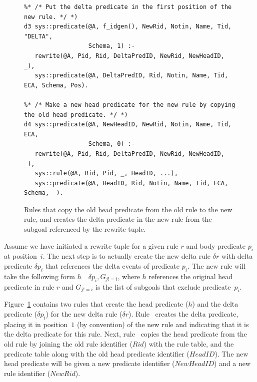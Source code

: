 \begin{figure}[!t]
\ssp
\centering
\begin{lstlisting}
%* /* Put the delta predicate in the first position of the new rule. */ *)
d3 sys::predicate(@A, f_idgen(), NewRid, Notin, Name, Tid, "DELTA", 
                  Schema, 1) :-
   rewrite(@A, Pid, Rid, DeltaPredID, NewRid, NewHeadID, _),
   sys::predicate(@A, DeltaPredID, Rid, Notin, Name, Tid, ECA, Schema, Pos).

%* /* Make a new head predicate for the new rule by copying the old head predicate. */ *)
d4 sys::predicate(@A, NewHeadID, NewRid, Notin, Name, Tid, ECA, 
                  Schema, 0) :-
   rewrite(@A, Pid, Rid, DeltaPredID, NewRid, NewHeadID, _),
   sys::rule(@A, Rid, Pid, _, HeadID, ...),
   sys::predicate(@A, HeadID, Rid, Notin, Name, Tid, ECA, Schema, _).
\end{lstlisting}
\caption{\label{ch:evita:fig:delta2}Rules that copy the old head predicate from the old rule
to the new rule, and creates the delta predicate in the new rule from the subgoal referenced
by the rewrite tuple.}
\end{figure}

Assume we have initiated a rewrite tuple for a given rule $r$ and body
predicate $p_i$ at position~$i$.  The next step is to actually create the new
delta rule $\delta r$ with delta predicate $\delta p_i$ that references the
delta events of predicate $p_i$.  The new rule will take the following form
$h$~\ol{:-}~$\delta p_i, G_{j!=i}$, where $h$ references the original head predicate
in rule $r$ and $G_{j!=i}$ is the list of subgoals that exclude
predicate~$p_i$.

Figure~\ref{ch:evita:fig:delta2} contains two rules that create the head
predicate ($h$) and the delta predicate ($\delta p_i$) for the new delta rule
($\delta r$).  Rule~ creates the delta predicate, placing it in
position~$1$ (by convention) of the new rule and indicating that it is the
delta predicate for this rule.  Next, rule~ copies the head predicate
from the old rule by joining the old rule identifier ($Rid$) with the rule
table, and the predicate table along with the old head predicate identifier
($HeadID$).  The new head predicate will be given a new predicate identifier
($NewHeadID$) and a new rule identifier ($NewRid$).


